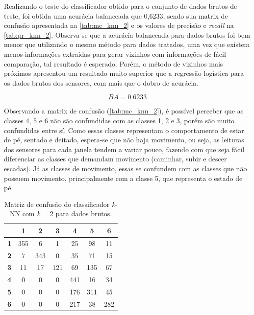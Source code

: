 Realizando o teste do classificador obtido para o conjunto de dados brutos de teste, foi obtida uma acurácia balanceada que 0,6233, sendo sua matrix de confusão apresentada na \autoref{tab:mc_knn_2} e os valores de precisão e \textit{recall} na \autoref{tab:pr_knn_2}. Observa-se que a acurácia balanceada para dados brutos foi bem menor que utilizando o mesmo método para dados tratados, uma vez que existem menos informações extraídas para gerar vizinhos com informações de fácil comparação, tal resultado é esperado. Porém, o método de vizinhos mais próximos apresentou um resultado muito superior que a regressão logística para os dados brutos dos sensores, com mais que o dobro de acurácia.

\begin{equation}
	BA = 0.6233
\end{equation}

Observando a matrix de confusão (\autoref{tab:mc_knn_2}), é possível perceber que as classes 4, 5 e 6 não são confundidas com as classes 1, 2 e 3, porém são muito confundidas entre sí. Como essas classes representam o comportamento de estar de pé, sentado e deitado, espera-se que não haja movimento, ou seja, as leituras dos sensores para cada janela tendem a variar pouco, fazendo com que seja fácil diferenciar as classes que demandam movimento (caminhar, subir e descer escadas). Já as classes de movimento, essas se confundem com as classes que não possuem movimento, principalmente com a classe 5, que representa o estado de pé.

\begin{table}[H]
	\centering
	\begin{tabular}{c||c|c|c|c|c|c|}\cline{2-7}
\textbf{}                        & \textbf{1} & \textbf{2} & \textbf{3} & \textbf{4} & \textbf{5} & \textbf{6} \\ \hline \hline
\multicolumn{1}{|c||}{\textbf{1}} & 355        & 6          & 1          & 25         & 98         & 11         \\ \hline
\multicolumn{1}{|c||}{\textbf{2}} & 7          & 343        & 0          & 35         & 71         & 15         \\ \hline
\multicolumn{1}{|c||}{\textbf{3}} & 11         & 17         & 121        & 69         & 135        & 67         \\ \hline
\multicolumn{1}{|c||}{\textbf{4}} & 0          & 0          & 0          & 441        & 16         & 34         \\ \hline
\multicolumn{1}{|c||}{\textbf{5}} & 0          & 0          & 0          & 176        & 311        & 45         \\ \hline
\multicolumn{1}{|c||}{\textbf{6}} & 0          & 0          & 0          & 217        & 38         & 282        \\ \hline
\end{tabular}
	\caption{Matriz de confusão do classificador \textit{k}-NN com \textit{k} = 2 para dados brutos.}
	\label{tab:mc_knn_2}
\end{table}

